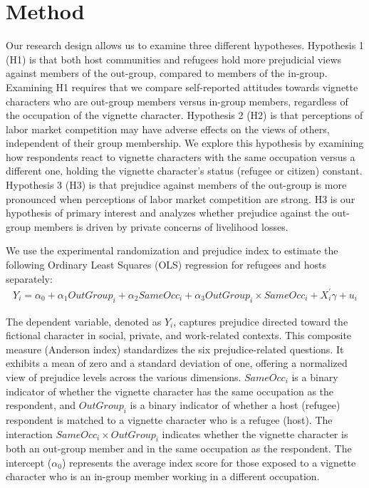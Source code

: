 \documentclass[a4paper,12pt]{article}
\begin{document}
\section{Method}

Our research design allows us to examine three different hypotheses. Hypothesis 1 (H1) is that both host communities and refugees hold more prejudicial views against members of the out-group, compared to members of the in-group. Examining H1 requires that we compare self-reported attitudes towards vignette characters who are out-group members versus in-group members, regardless of the occupation of the vignette character. Hypothesis 2 (H2) is that perceptions of labor market competition may have adverse effects on the views of others, independent of their group membership. We explore this hypothesis by examining how respondents react to vignette characters with the same occupation versus a different one, holding the vignette character's status (refugee or citizen) constant. Hypothesis 3 (H3) is that prejudice against members of the out-group is more pronounced when perceptions of labor market competition are strong. H3 is our hypothesis of primary interest and analyzes whether prejudice against the out-group members is driven by private concerns of livelihood losses. 

We use the experimental randomization and prejudice index to estimate the following Ordinary Least Squares (OLS) regression for refugees and hosts separately:
\begin{equation} 
\label{eq:mainspe}
\begin{split}
    Y_{i} = \alpha_{0} + \alpha_{1} OutGroup_{i} + \alpha_{2} SameOcc_{i}  
    +  \alpha_{3} OutGroup_{i} \times SameOcc_{i} + X_{i}^{'} \gamma + u_{i}
\end{split}
\end{equation} 

\noindent
The dependent variable, denoted as $Y_{i}$, captures prejudice directed toward the fictional character in social, private, and work-related contexts. This composite measure (Anderson index) standardizes the six prejudice-related questions. It exhibits a mean of zero and a standard deviation of one, offering a normalized view of prejudice levels across the various dimensions. 
$SameOcc_{i}$ is a binary indicator of whether the vignette character has the same occupation as the respondent, and $OutGroup_{i}$ is a binary indicator of whether a host (refugee) respondent is matched to a vignette character who is a refugee (host). The interaction $SameOcc_{i} \times OutGroup_{i}$ indicates whether the vignette character is both an out-group member and in the same occupation as the respondent. The intercept ($\alpha_{0}$) represents the average index score for those exposed to a vignette character who is an in-group member working in a different occupation. 
\end{document}
